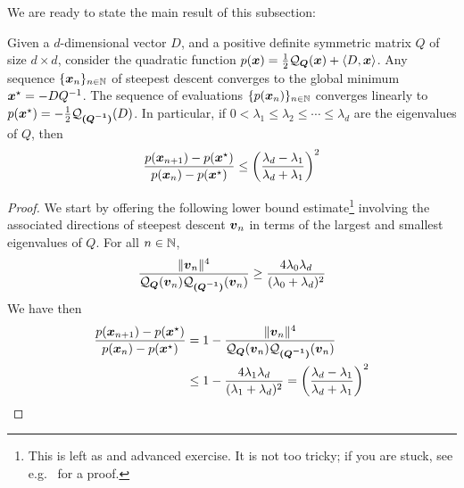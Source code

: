We are ready to state the main result of this subsection:
\begin{theorem}\label{theorem:KantorovichEstimate}
Given a $d$-dimensional vector $D$, and a positive definite symmetric matrix $Q$ of size $d \times d$, consider the quadratic function $p(\boldsymbol{x}) = \tfrac{1}{2}\mathcal{Q}_{\boldsymbol{Q}}(\boldsymbol{x}) + \langle D , \boldsymbol{x} \rangle$.  Any sequence $\{ \boldsymbol{x}_n \}_{n \in \mathbb{N}}$ of steepest descent converges to the global minimum $\boldsymbol{x}^{\star} = -DQ^{-1}$.  The sequence of evaluations $\{ p(\boldsymbol{x}_n) \}_{n \in \mathbb{N}}$ converges linearly to $p(\boldsymbol{x}^{\star}) = -\tfrac{1}{2}\mathcal{Q}_{\boldsymbol{(Q^{-1})}}(D)$.  In particular, if $0 < \lambda_1 \leq \lambda_2 \leq \dotsb \leq \lambda_d$ are the eigenvalues of $Q$, then 
\begin{equation*}
\frac{p(\boldsymbol{x}_{n+1}) - p(\boldsymbol{x}^{\star})}{p(\boldsymbol{x}_n)- p(\boldsymbol{x}^{\star})} \leq \bigg( \frac{\lambda_d -\lambda_1}{\lambda_d + \lambda_1} \bigg)^2
\end{equation*}
\end{theorem}
\begin{proof}
We start by offering the following lower bound estimate\footnote{This is left as and advanced exercise. It is not too tricky; if you are stuck, see e.g.~\cite[section 1.3.1]{bertsekas1999nonlinear} for a proof.} involving the associated directions of steepest descent $\boldsymbol{v}_n$ in terms of the largest and smallest eigenvalues of $Q$.  For all $n \in \mathbb{N}$,
\begin{equation}\label{equation:KantorovichEstimate}
\frac{\lVert \boldsymbol{v}_n \rVert^4}{\mathcal{Q}_{\boldsymbol{Q}}(\boldsymbol{v}_n) \mathcal{Q}_{\boldsymbol{(Q^{-1})}}(\boldsymbol{v}_n)} \geq \frac{4\lambda_0\lambda_d}{(\lambda_0 + \lambda_d)^2}
\end{equation}
We have then
\begin{align*}
\frac{p(\boldsymbol{x}_{n+1}) - p(\boldsymbol{x}^{\star})}{p(\boldsymbol{x}_n)- p(\boldsymbol{x}^{\star})} &= 1 - \frac{\lVert \boldsymbol{v}_n \rVert^4}{ \mathcal{Q}_{\boldsymbol{Q}}(\boldsymbol{v}_n) \mathcal{Q}_{\boldsymbol{(Q^{-1})}}(\boldsymbol{v}_n) } \\
&\leq 1 - \frac{4\lambda_1 \lambda_d}{(\lambda_1 + \lambda_d)^2} = \bigg( \frac{\lambda_d - \lambda_1}{\lambda_d + \lambda_1} \bigg)^2 \qedhere
\end{align*}
\end{proof}

